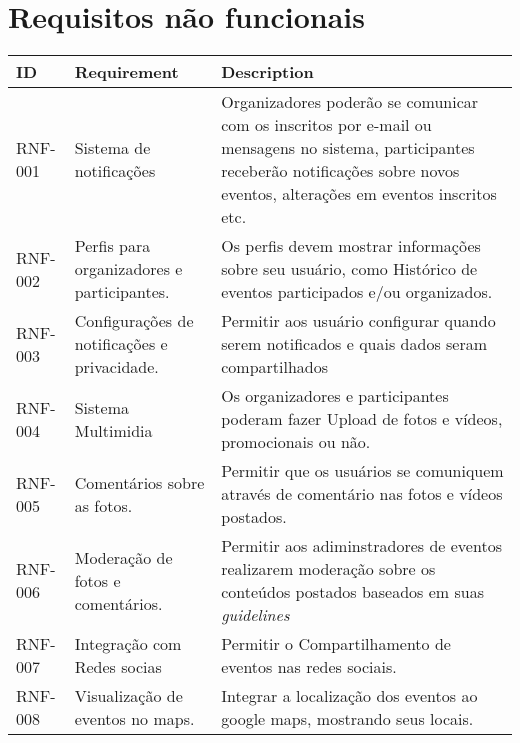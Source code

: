 \section{Requisitos não funcionais}
\begin{tabular}{>{\raggedright}p{1.5cm}>{\raggedright}p{4cm}>{\raggedright}p{10cm}}
\toprule
\textbf{ID} & \textbf{Requirement} & \textbf{Description} \tabularnewline 
\midrule
RNF-001 & Sistema de notificações & Organizadores poderão se comunicar com os inscritos por e-mail ou mensagens no sistema, participantes receberão notiﬁcações sobre novos eventos, alterações em eventos inscritos etc. \tabularnewline \hline
RNF-002 & Perﬁs para organizadores e participantes. & Os perfis devem mostrar informações sobre seu usuário, como Histórico de eventos participados e/ou organizados. \tabularnewline \hline
RNF-003 & Conﬁgurações de notiﬁcações e privacidade. & Permitir aos usuário configurar quando serem notificados e quais dados seram compartilhados \tabularnewline \hline
RNF-004 & Sistema Multimidia & Os organizadores e participantes poderam fazer Upload de fotos e vídeos, promocionais ou não. \tabularnewline \hline 
RNF-005 & Comentários sobre as fotos. & Permitir que os usuários se comuniquem através de comentário nas fotos e vídeos postados. \tabularnewline \hline 
RNF-006 & Moderação de fotos e comentários. & Permitir aos adiminstradores de eventos realizarem moderação sobre os conteúdos postados baseados em suas \textit{guidelines} \tabularnewline \hline
RNF-007 & Integração com Redes socias & Permitir o Compartilhamento de eventos nas redes sociais. \tabularnewline \hline
RNF-008 & Visualização de eventos no maps. & Integrar a localização dos eventos ao google maps, mostrando seus locais.\tabularnewline

\bottomrule
\end{tabular}


